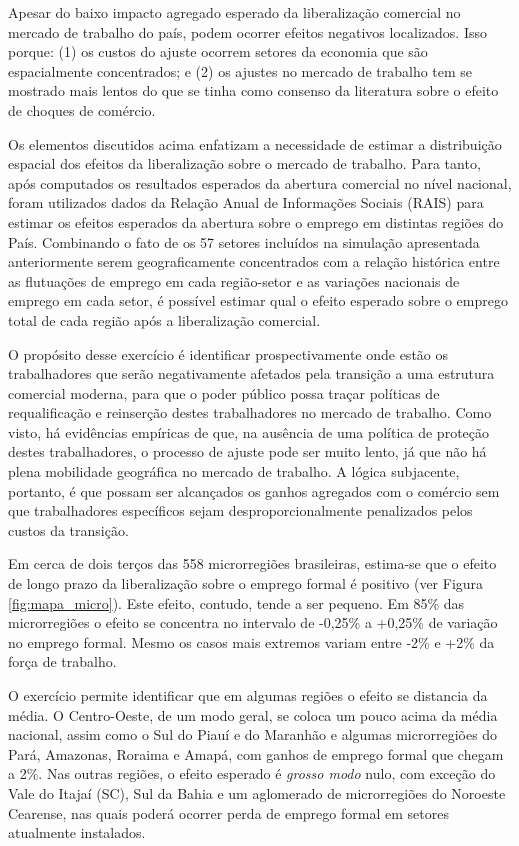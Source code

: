 \documentclass{article}
\begin{document}
Apesar do baixo impacto agregado esperado da liberalização comercial no mercado de trabalho do país, podem ocorrer efeitos negativos localizados. Isso porque: (1) os custos do ajuste ocorrem setores da economia que são espacialmente concentrados; e (2) os ajustes no mercado de trabalho tem se mostrado mais lentos do que se tinha como consenso da literatura sobre o efeito de choques de comércio. 

Os elementos discutidos acima enfatizam a necessidade de estimar a distribuição espacial dos efeitos da liberalização sobre o mercado de trabalho.  Para tanto, após computados os resultados esperados da abertura comercial no nível nacional, foram utilizados dados da Relação Anual de Informações Sociais (RAIS) para estimar os efeitos esperados da abertura sobre o emprego em distintas regiões do País. Combinando o fato de os 57 setores incluídos na simulação apresentada anteriormente serem geograficamente concentrados com a relação histórica entre as flutuações de emprego em cada região-setor e as variações nacionais de emprego em cada setor, é possível estimar qual o efeito esperado sobre o emprego total de cada região após a liberalização comercial.  

O propósito desse exercício é identificar prospectivamente onde estão os trabalhadores que serão negativamente afetados pela transição a uma estrutura comercial moderna, para que o poder público possa traçar políticas de requalificação e reinserção destes trabalhadores no mercado de trabalho. Como visto, há evidências empíricas de que, na ausência de uma política de proteção destes trabalhadores, o processo de ajuste pode ser muito lento, já que não há plena mobilidade geográfica no mercado de trabalho. A lógica subjacente, portanto, é que possam ser alcançados os ganhos agregados com o comércio sem que trabalhadores específicos sejam desproporcionalmente penalizados pelos custos da transição.

Em cerca de dois terços das 558 microrregiões brasileiras, estima-se que o efeito de longo prazo da liberalização sobre o emprego formal é positivo (ver Figura \ref{fig:mapa_micro}). Este efeito, contudo, tende a ser pequeno. Em 85\% das microrregiões o efeito se concentra no intervalo de -0,25\% a +0,25\% de variação no emprego formal. Mesmo os casos mais extremos variam entre -2\% e +2\% da força de trabalho.

O exercício permite identificar que em algumas regiões o efeito se distancia da média. O Centro-Oeste, de um modo geral, se coloca um pouco acima da média nacional, assim como o Sul do Piauí e do Maranhão e algumas microrregiões do Pará, Amazonas, Roraima e Amapá, com ganhos de emprego formal que chegam a 2\%. Nas outras regiões, o efeito esperado é \textit{grosso modo} nulo, com exceção do Vale do Itajaí (SC), Sul da Bahia e um aglomerado de microrregiões do Noroeste Cearense, nas quais poderá ocorrer perda de emprego formal em setores atualmente instalados.
\end{document}
